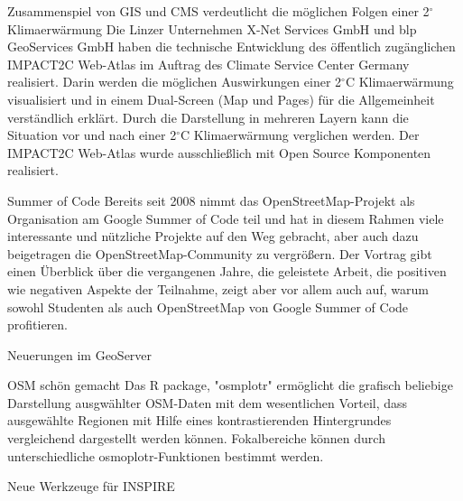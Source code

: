 \renewcommand{\konferenztag}{\mittwoch}
%
{Zusammenspiel von GIS und CMS verdeutlicht die möglichen Folgen einer 2$^\circ$ Klimaerwärmung}%
{}%
{Die Linzer Unternehmen X-Net Services GmbH und blp GeoServices GmbH haben die technische Entwicklung
des öffentlich zugänglichen IMPACT2C Web-Atlas im Auftrag des Climate Service Center Germany realisiert.
Darin werden die möglichen Auswirkungen einer 2$^\circ$C Klimaerwärmung visualisiert und in einem Dual-Screen
(Map und Pages) für die Allgemeinheit verständlich erklärt. Durch die Darstellung in mehreren Layern
kann die Situation vor und nach einer 2$^\circ$C Klimaerwärmung verglichen werden.
Der IMPACT2C Web-Atlas wurde ausschließlich mit Open Source Komponenten realisiert.}

%
{Summer of Code}%
{}%
{Bereits seit 2008 nimmt das OpenStreetMap-Projekt als Organisation am Google Summer of Code teil und
hat in diesem Rahmen viele interessante und nützliche Projekte auf den Weg gebracht, aber auch dazu
beigetragen die OpenStreetMap-Community zu vergrößern. Der Vortrag gibt einen Überblick über die
vergangenen Jahre, die geleistete Arbeit, die positiven wie negativen Aspekte der Teilnahme, zeigt
aber vor allem auch auf, warum sowohl Studenten als auch OpenStreetMap von Google Summer of Code profitieren.}

%
{Neuerungen im GeoServer}%
{}%
{}

%
{OSM schön gemacht}%
{}%
{Das R package, "osmplotr" ermöglicht  die grafisch beliebige Darstellung ausgwählter OSM-Daten mit dem
wesentlichen Vorteil, dass ausgewählte Regionen mit Hilfe eines kontrastierenden Hintergrundes vergleichend
dargestellt werden können. Fokalbereiche können durch unterschiedliche osmoplotr-Funktionen bestimmt werden.}

%
{Neue Werkzeuge für INSPIRE}%
{}%
{}

